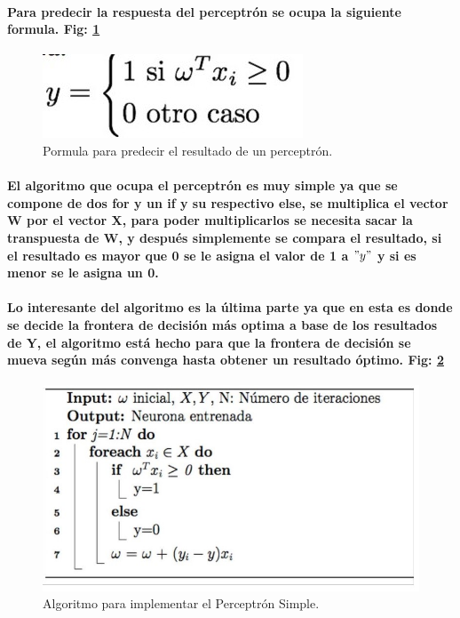 \documentclass[10pt,a4paper]{article}
\begin{document}
\paragraph{Para predecir la respuesta del perceptr\'on se ocupa la siguiente formula. Fig: \ref{fig:Formula}}

\begin{figure}[h]
\includegraphics[scale=0.5] {f.jpg}
\caption{Pormula para predecir el resultado de un perceptr\'on.}
\label{fig:Formula}
\end{figure}

\paragraph{El algoritmo que ocupa el perceptr\'on es muy simple ya que se compone de dos for y un if y su respectivo else, se multiplica el vector W por el vector X, para poder multiplicarlos se necesita sacar la transpuesta de W, y despu\'es simplemente se compara el resultado, si el resultado es mayor que 0 se le asigna el valor de 1 a $"y"$ y si es menor se le asigna un 0.}

\paragraph{Lo interesante del algoritmo es la \'ultima parte ya que en esta es donde se decide la frontera de decisi\'on m\'as optima a base de los resultados de Y, el algoritmo est\'a hecho para que la frontera de decisi\'on se mueva seg\'un m\'as convenga hasta obtener un resultado \'optimo. Fig: \ref{fig:Algo} }

\begin{figure}[h]
\includegraphics[scale=0.5] {Algorit.jpg}
\caption{Algoritmo para implementar el Perceptr\'on Simple.}
\label{fig:Algo}
\end{figure}
\end{document}
